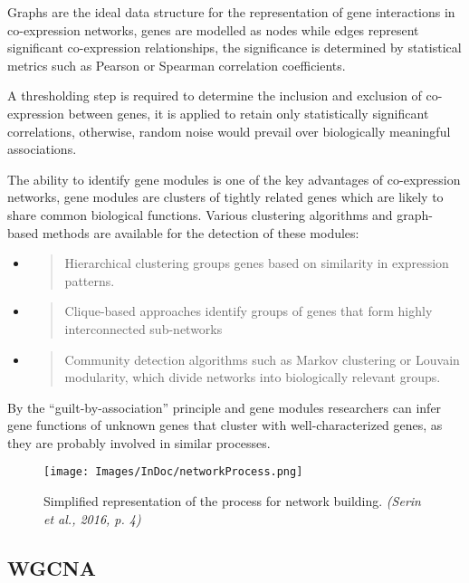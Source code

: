 \documentclass[
]{article}
\begin{document}
Graphs are the ideal data structure for the representation of gene
interactions in co-expression networks, genes are modelled as nodes
while edges represent significant co-expression relationships, the
significance is determined by statistical metrics such as Pearson or
Spearman correlation coefficients.

A thresholding step is required to determine the inclusion and exclusion
of co-expression between genes, it is applied to retain only
statistically significant correlations, otherwise, random noise would
prevail over biologically meaningful associations.

The ability to identify gene modules is one of the key advantages of
co-expression networks, gene modules are clusters of tightly related
genes which are likely to share common biological functions. Various
clustering algorithms and graph-based methods are available for the
detection of these modules:

\begin{itemize}
\item
  \begin{quote}
  Hierarchical clustering groups genes based on similarity in expression
  patterns.
  \end{quote}
\item
  \begin{quote}
  Clique-based approaches identify groups of genes that form highly
  interconnected sub-networks
  \end{quote}
\item
  \begin{quote}
  Community detection algorithms such as Markov clustering or Louvain
  modularity, which divide networks into biologically relevant groups.
  \end{quote}
\end{itemize}

By the ``guilt-by-association'' principle and gene modules researchers
can infer gene functions of unknown genes that cluster with
well-characterized genes, as they are probably involved in similar
processes.

\begin{figure}[H]
  \centering
  \texttt{[image: Images/InDoc/networkProcess.png]}
  \caption[Network Diagram]{\small Simplified representation of the process for network building. \textit{(Serin et al., 2016, p. 4)}}
    \label{fig:nwDg}
\end{figure}

\hypertarget{wgcna}{%
\subsection{WGCNA}\label{wgcna}}
\end{document}
